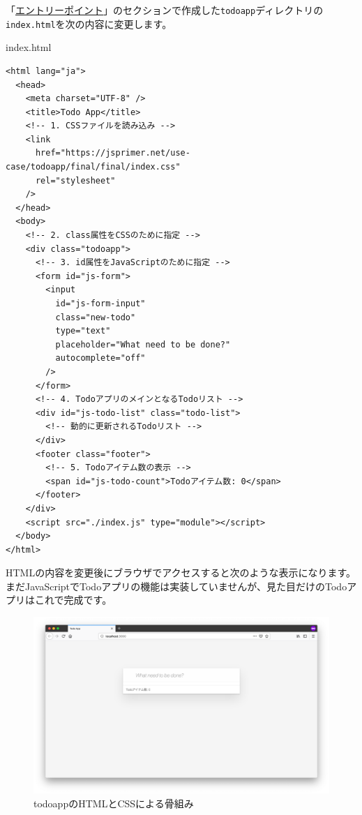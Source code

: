 「\href{../entrypoint/README.md}{エントリーポイント}」のセクションで作成した\texttt{todoapp}ディレクトリの\texttt{index.html}を次の内容に変更します。

\begin{listtitle}
index.html
\end{listtitle}
\begin{lstlisting}
<html lang="ja">
  <head>
    <meta charset="UTF-8" />
    <title>Todo App</title>
    <!-- 1. CSSファイルを読み込み -->
    <link
      href="https://jsprimer.net/use-case/todoapp/final/final/index.css"
      rel="stylesheet"
    />
  </head>
  <body>
    <!-- 2. class属性をCSSのために指定 -->
    <div class="todoapp">
      <!-- 3. id属性をJavaScriptのために指定 -->
      <form id="js-form">
        <input
          id="js-form-input"
          class="new-todo"
          type="text"
          placeholder="What need to be done?"
          autocomplete="off"
        />
      </form>
      <!-- 4. TodoアプリのメインとなるTodoリスト -->
      <div id="js-todo-list" class="todo-list">
        <!-- 動的に更新されるTodoリスト -->
      </div>
      <footer class="footer">
        <!-- 5. Todoアイテム数の表示 -->
        <span id="js-todo-count">Todoアイテム数: 0</span>
      </footer>
    </div>
    <script src="./index.js" type="module"></script>
  </body>
</html>
\end{lstlisting}
\listend

HTMLの内容を変更後にブラウザでアクセスすると次のような表示になります。
まだJavaScriptでTodoアプリの機能は実装していませんが、見た目だけのTodoアプリはこれで完成です。

\begin{figure}
\centering
\includegraphics[width=120mm]{./fig/todo-html.png}
\caption{todoappのHTMLとCSSによる骨組み}
\end{figure}


